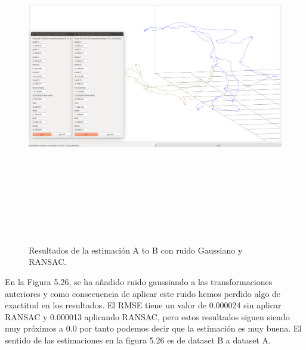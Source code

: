 \begin{figure}[H]
\begin{center}
\label{fig:opciones de View}\includegraphics[height=14.0cm,width=18.0cm]{img/cap6/newData_EscalaTraslaRotaGauss_ba.png}
\hspace{0.5cm}

\end{center}

\caption{Resultados de la estimación A to B con ruido Gaussiano y RANSAC.}
\end{figure}
En la Figura 5.26, se ha añadido ruido gaussiando a las transformaciones anteriores y como consecuencia de aplicar este ruido hemos perdido algo de exactitud en los resultados.
El RMSE tiene un valor de 0.000024 sin aplicar RANSAC y 0.000013 aplicando RANSAC, pero estos resultados siguen siendo muy próximos a 0.0 por tanto podemos decir que la estimación es muy buena.
El sentido de las estimaciones en la figura 5.26 es de dataset B a dataset A.



